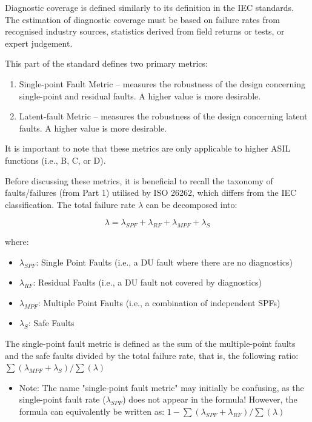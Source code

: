 \documentclass[./dissertation.tex]{subfiles}
\begin{document}
Diagnostic coverage is defined similarly to its definition in the IEC standards. The estimation of diagnostic coverage must be based on failure rates from recognised industry sources, statistics derived from field returns or tests, or expert judgement.

This part of the standard defines two primary metrics:

\begin{enumerate}
\item Single-point Fault Metric – measures the robustness of the design concerning single-point and residual faults. A higher value is more desirable.
\item Latent-fault Metric – measures the robustness of the design concerning latent faults. A higher value is more desirable.
\end{enumerate}

It is important to note that these metrics are only applicable to higher ASIL functions (i.e., B, C, or D).

Before discussing these metrics, it is beneficial to recall the taxonomy of faults/failures (from Part 1) utilised by ISO 26262, which differs from the IEC classification. The total failure rate $\lambda$ can be decomposed into:

\begin{equation}
\lambda = \lambda_{SPF} + \lambda_{RF} + \lambda_{MPF} + \lambda_{S}
\end{equation}

where:

\begin{itemize}
\item $\lambda_{SPF}$: Single Point Faults (i.e., a DU fault where there are no diagnostics)
\item $\lambda_{RF}$: Residual Faults (i.e., a DU fault not covered by diagnostics)
\item $\lambda_{MPF}$: Multiple Point Faults (i.e., a combination of independent SPFs)
\item $\lambda_{S}$: Safe Faults
\end{itemize}

The single-point fault metric is defined as the sum of the multiple-point faults and the safe faults divided by the total failure rate, that is, the following ratio: $\sum(\lambda_{MPF} + \lambda_{S}) / \sum(\lambda)$

\begin{itemize}
\item Note: The name "single-point fault metric" may initially be confusing, as the single-point fault rate ($\lambda_{SPF}$) does not appear in the formula! However, the formula can equivalently be written as: $1 - \sum(\lambda_{SPF} + \lambda_{RF}) / \sum(\lambda)$
\end{itemize}
\end{document}
